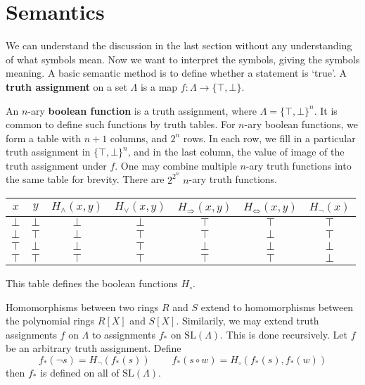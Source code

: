 \section{Semantics}

We can understand the discussion in the last section without any understanding of what symbols mean. Now we want to interpret the symbols, giving the symbols meaning. A basic semantic method is to define whether a statement is `true'. A {\bf truth assignment} on a set $\Lambda$ is a map $f: \Lambda \to \{ \top, \bot \}$.

\begin{example}
    An $n$-ary {\bf boolean function} is a truth assignment, where $\Lambda = \{ \top, \bot \}^n$. It is common to define such functions by truth tables. For $n$-ary boolean functions, we form a table with $n + 1$ columns, and $2^{n}$ rows. In each row, we fill in a particular truth assignment in $\{ \top, \bot \}^n$, and in the last column, the value of image of the truth assignment under $f$. One may combine multiple $n$-ary truth functions into the same table for brevity. There are $2^{2^{n}}$ $n$-ary truth functions.
    \begin{center}
    \begin{tabular}{| c | c | c | c | c | c | c |}
        \hline $x$ & $y$ & $H_\wedge(x,y)$ & $H_\vee(x,y)$ & $H_\Rightarrow(x,y)$ & $H_\Leftrightarrow(x,y)$ & $H_\neg(x)$ \\
        \hline $\bot$ & $\bot$ & $\bot$ & $\bot$ & $\top$ & $\top$ & $\top$ \\
        $\bot$ & $\top$ & $\bot$ & $\top$ & $\top$ & $\bot$ & $\top$ \\
        $\top$ & $\bot$ & $\bot$ & $\top$ & $\bot$ & $\bot$ & $\bot$ \\
        $\top$ & $\top$ & $\top$ & $\top$ & $\top$ & $\top$ & $\bot$ \\
        \hline
    \end{tabular}
    \end{center}
    This table defines the boolean functions $H_\circ$.
\end{example}

Homomorphisms between two rings $R$ and $S$ extend to homomorphisms between the polynomial rings $R[X]$ and $S[X]$. Similarily, we may extend truth assignments $f$ on $\Lambda$ to assignments $f_*$ on $\text{SL}(\Lambda)$. This is done recursively. Let $f$ be an arbitrary truth assignment. Define
%
\[ f_*(\neg s) = H_\neg(f_*(s))\ \ \ \ \ \ \ \ \ \ f_*(s \circ w) = H_\circ(f_*(s), f_*(w)) \]
%
then $f_*$ is defined on all of $\text{SL}(\Lambda)$.

